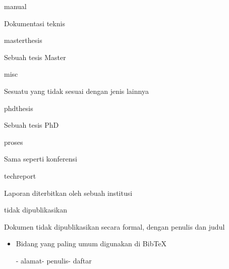 \begin{itemize}
manual\par




Dokumentasi teknis\par




masterthesis\par




Sebuah tesis Master\par




misc\par




Sesuatu yang tidak sesuai dengan jenis lainnya\par




phdthesis\par




Sebuah tesis PhD\par




proses\par




Sama seperti konferensi\par




techreport\par




Laporan diterbitkan oleh sebuah institusi\par




tidak dipublikasikan\par




Dokumen tidak dipublikasikan secara formal, dengan penulis dan judul\par


\vspace{\baselineskip}
\begin{itemize}
	\item Bidang yang paling umum digunakan di BibTeX\hspace*{0.5in}\par

\hspace*{0.3in}- alamat\hspace*{0.3in}\hspace*{0.3in}- penulis\hspace*{0.3in}\hspace*{0.3in}- daftar\par


\end{itemize}
\end{itemize}
